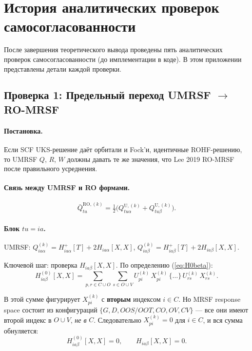 \documentclass[11pt, a4paper]{article}
\theoremstyle{definition}
\newcommand{\bQ}{\bar Q}
\newcommand{\Uk}[2]{U^{(#1)}_{#2}}
\newcommand{\Xk}[2]{X^{(#1)}_{#2}}
\newcommand{\Hp}{H^{+}}
\begin{document}
\appendix
\section{История аналитических проверок самосогласованности}
\label{app:checks}

После завершения теоретического вывода проведены пять аналитических проверок самосогласованности (до имплементации в коде). В этом приложении представлены детали каждой проверки.

\subsection{Проверка 1: Предельный переход UMRSF $\to$ RO-MRSF}

\paragraph{Постановка.} Если SCF UKS-решение даёт орбитали и Fock'и, идентичные ROHF-решению, то UMRSF $Q$, $R$, $W$ должны давать те же значения, что Lee 2019 RO-MRSF после правильного усреднения.

\paragraph{Связь между UMRSF и RO формами.}
\begin{equation}
    \bQ^{\text{RO},(k)}_{tu} = \tfrac{1}{2}\bigl( Q^{\text{U},(k)}_{tu\alpha} + Q^{\text{U},(k)}_{tu\beta} \bigr).
\end{equation}

\paragraph{Блок $tu = ia$.}

UMRSF: $Q^{(k)}_{ia\alpha} = \Hp_{ia\alpha}[T] + 2 H_{ia\alpha}[X, X]$, $Q^{(k)}_{ia\beta} = \Hp_{ia\beta}[T] + 2 H_{ia\beta}[X, X]$.

Ключевой шаг: проверка $H_{ia\beta}[X, X]$. По определению (\cref{eq:H0beta}):
$$
H^{(0)}_{ia\beta}[X, X] = \sum_{p, r \in C \cup O}\sum_{s \in O \cup V} \Uk{k}{pi}\, \Xk{k}{pi}\, \{\ldots\}\, \Uk{k}{rs}\, \Xk{k}{rs}.
$$

В этой сумме фигурирует $\Xk{k}{pi}$ с \textbf{вторым} индексом $i \in C$. Но MRSF response space состоит из конфигураций $\{G, D, OOS/OOT, CO, OV, CV\}$ --- все они имеют второй индекс в $O \cup V$, \emph{не в} $C$. Следовательно $\Xk{k}{pi} = 0$ для $i \in C$, и вся сумма обнуляется:
$$
H^{(0)}_{ia\beta}[X, X] = 0, \qquad H_{ia\beta}[X, X] = 0.
$$
\end{document}
